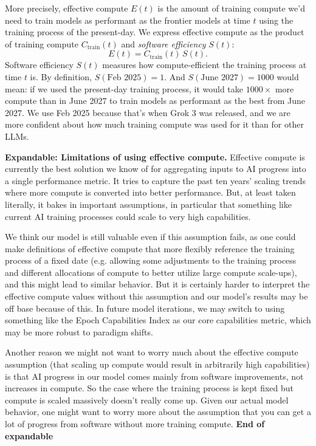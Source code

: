 \documentclass{article}
\theoremstyle{definition}
\begin{document}
More precisely, effective compute $E(t)$ is the amount of training compute we'd need to train models as performant as the frontier models at time $t$ using the training process of the present-day. We express effective compute as the product of training compute $C_\text{train}(t)$ and \textit{software efficiency} $S(t)$:
\[ E(t) = C_\text{train}(t) \, S(t).\]
Software efficiency $S(t)$ measures how compute-efficient the training process at time $t$ is. By definition, $S(\text{Feb 2025}) = 1$. And $S(\text{June 2027}) = 1000$ would mean: if we used the present-day training process, it would take $1000 \times$ more compute than in June 2027 to train models as performant as the best from June 2027. We use Feb 2025 because that's when Grok 3 was released, and we are more confident about how much training compute was used for it than for other LLMs.

\textbf{Expandable: Limitations of using effective compute.} Effective compute is currently the best solution we know of for aggregating inputs to AI progress into a single performance metric. It tries to capture the past ten years' scaling trends where more compute is converted into better performance. But, at least taken literally, it bakes in important assumptions, in particular that something like current AI training processes could scale to very high capabilities.
 
We think our model is still valuable even if this assumption fails, as one could make definitions of effective compute that more flexibly reference the training process of a fixed date (e.g. allowing some adjustments to the training process and different allocations of compute to better utilize large compute scale-ups), and this might lead to similar behavior. But it is certainly harder to interpret the effective compute values without this assumption and our model's results may be off base because of this. In future model iterations, we may switch to using something like the Epoch Capabilities Index as our core capabilities metric, which may be more robust to paradigm shifts.

Another reason we might not want to worry much about the effective compute assumption (that scaling up compute would result in arbitrarily high capabilities) is that AI progress in our model comes mainly from software improvements, not increases in compute. So the case where the training process is kept fixed but compute is scaled massively doesn't really come up. Given our actual model behavior, one might want to worry more about the assumption that you can get a lot of progress from software without more training compute. \textbf{End of expandable}
\end{document}
